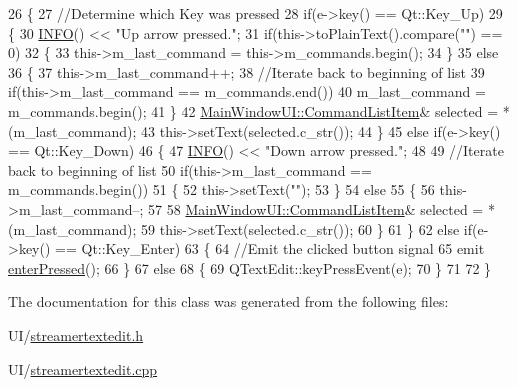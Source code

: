 \begin{DoxyCode}
26 \{
27     \textcolor{comment}{//Determine which Key was pressed}
28     \textcolor{keywordflow}{if}(e->key() == Qt::Key\_Up)
29     \{
30         \hyperlink{Log_8h_a7cec51f4ce4b22e8c0f256485d57fca7}{INFO}() << \textcolor{stringliteral}{"Up arrow pressed."};
31         \textcolor{keywordflow}{if}(this->toPlainText().compare(\textcolor{stringliteral}{""}) == 0)
32         \{
33             this->m\_last\_command = this->m\_commands.begin();
34         \}
35         \textcolor{keywordflow}{else}
36         \{
37             this->m\_last\_command++;
38             \textcolor{comment}{//Iterate back to beginning of list}
39             \textcolor{keywordflow}{if}(this->m\_last\_command == m\_commands.end())
40                 m\_last\_command = m\_commands.begin();
41         \}
42         \hyperlink{namespaceMainWindowUI_ab4a56a6d14c3fc1c53d1f1373a9033d3}{MainWindowUI::CommandListItem}& selected = *(m\_last\_command);
43         this->setText(selected.c\_str());
44     \}
45     \textcolor{keywordflow}{else} \textcolor{keywordflow}{if}(e->key() == Qt::Key\_Down)
46     \{
47         \hyperlink{Log_8h_a7cec51f4ce4b22e8c0f256485d57fca7}{INFO}() << \textcolor{stringliteral}{"Down arrow pressed."};
48 
49         \textcolor{comment}{//Iterate back to beginning of list}
50         \textcolor{keywordflow}{if}(this->m\_last\_command == m\_commands.begin())
51         \{
52             this->setText(\textcolor{stringliteral}{""});
53         \}
54         \textcolor{keywordflow}{else}
55         \{
56             this->m\_last\_command--;
57 
58             \hyperlink{namespaceMainWindowUI_ab4a56a6d14c3fc1c53d1f1373a9033d3}{MainWindowUI::CommandListItem}& selected = *(m\_last\_command);
59             this->setText(selected.c\_str());
60         \}
61     \}
62     \textcolor{keywordflow}{else} \textcolor{keywordflow}{if}(e->key() == Qt::Key\_Enter)
63     \{
64         \textcolor{comment}{//Emit the clicked button signal}
65         emit \hyperlink{classStreamerTextEdit_aef9c5b51fb00edb2f984128e612629be}{enterPressed}();
66     \}
67     \textcolor{keywordflow}{else}
68     \{
69         QTextEdit::keyPressEvent(e);
70     \}
71 
72 \}
\end{DoxyCode}


The documentation for this class was generated from the following files\-:\begin{DoxyCompactItemize}
\item 
U\-I/\hyperlink{streamertextedit_8h}{streamertextedit.\-h}\item 
U\-I/\hyperlink{streamertextedit_8cpp}{streamertextedit.\-cpp}\end{DoxyCompactItemize}
